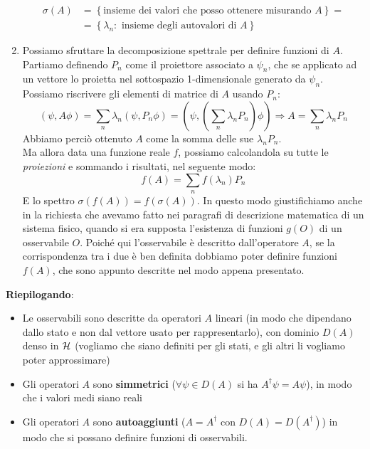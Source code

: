 \begin{enumerate}
\begin{align*}
	    \sigma \left(A\right)&=\left\{\text {insieme dei valori che posso ottenere misurando } A\right\}= \\
	    &=\left\{\lambda_n:\text{ insieme degli autovalori di } A\right\}
	\end{align*}
\item Possiamo sfruttare la decomposizione spettrale per definire funzioni di $A$.\\
Partiamo definendo $P_n$ come il proiettore associato a $\psi_n$, che se applicato ad un vettore lo proietta nel sottospazio 1-dimensionale generato da $\psi_n$. Possiamo riscrivere gli elementi di matrice di $A$ usando $P_n$:
	\[
	\left(\psi, A\phi\right)=\sum_{n}{\lambda_n\left(\psi,P_n\phi\right)}=\left(\psi, \left(\sum_{n}{\lambda_n P_n}\right)\phi\right) \Rightarrow A=\sum_{n}{\lambda_n P_n}
	\]
	Abbiamo perciò ottenuto $A$ come la somma delle sue  $\lambda_n P_n$.\\
	Ma allora data una funzione reale $f$, possiamo 
	calcolandola su tutte le \textit{proiezioni} e sommando i risultati, nel seguente modo:
	\begin{equation}
	f\left(A\right)=\sum_{n}{f\left(\lambda_n\right)P_n}
	\label{eqn:funzioniop}
	\end{equation}
	E lo spettro $\sigma \left(f\left(A\right)\right)=f(\sigma \left(A\right))$. 
	In questo modo giustifichiamo anche in \MQ la richiesta che avevamo fatto nei paragrafi di descrizione matematica di un sistema fisico, quando si era supposta l'esistenza di funzioni $g(O)$ di un osservabile $O$. Poiché qui l'osservabile è descritto dall'operatore $A$, se la corrispondenza tra i due è ben definita dobbiamo poter definire funzioni $f(A)$, che sono appunto descritte nel modo appena presentato.
\end{enumerate}

\textbf{Riepilogando}:
\begin{itemize}
    \item Le osservabili sono descritte da operatori $A$ lineari (in modo che dipendano dallo stato e non dal vettore usato per rappresentarlo), con dominio $D(A)$ denso in $\mathcal{H}$ (vogliamo che siano definiti per  gli stati, e gli altri li vogliamo poter approssimare) %
    \item Gli operatori $A$ sono \textbf{simmetrici} ($\forall \psi \in D(A)$ si ha $A^\dag \psi = A\psi$), in modo che i valori medi siano reali
    \item Gli operatori $A$ sono \textbf{autoaggiunti} ($A = A^\dag$ con $D(A) = D(A^\dag)$) in modo che si possano definire funzioni di osservabili.
\end{itemize}

